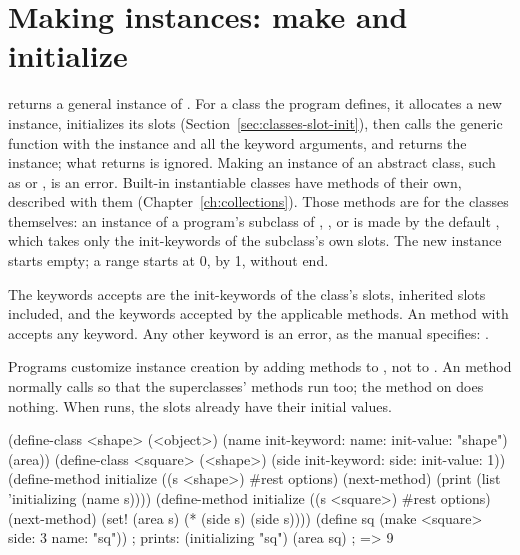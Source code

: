 \section{Making instances: make and initialize}\label{sec:classes-make}

\begin{quote}
\end{quote}

\noindent {} returns a general instance of . For a
class the program defines, it allocates a new instance, initializes its
slots (Section~\ref{sec:classes-slot-init}), then calls the generic function
 with the instance and all the keyword arguments, and
returns the instance; what  returns is ignored. Making an
instance of an abstract class, such as  or
, is an error. Built-in instantiable classes have
 methods of their own, described with them
(Chapter~\ref{ch:collections}). Those methods are for the classes
themselves: an instance of a program's subclass of ,
,  or  is made by
the default , which takes only the init-keywords of the
subclass's own slots. The new instance starts empty; a range starts at 0,
by 1, without end.

The keywords  accepts are the init-keywords of the class's slots,
inherited slots included, and the keywords accepted by the applicable
 methods. An  method with 
accepts any keyword. Any other keyword is an error, as the manual
specifies: .

Programs customize instance creation by adding methods to
, not to . An  method normally
calls  so that the superclasses' methods run too; the
method on  does nothing. When  runs, the
slots already have their initial values.

\begin{dylan}
(define-class <shape> (<object>)
  (name init-keyword: name: init-value: "shape")
  (area))
(define-class <square> (<shape>)
  (side init-keyword: side: init-value: 1))
(define-method initialize ((s <shape>) #rest options)
  (next-method)
  (print (list 'initializing (name s))))
(define-method initialize ((s <square>) #rest options)
  (next-method)
  (set! (area s) (* (side s) (side s))))
(define sq (make <square> side: 3 name: "sq"))
                               ; prints: (initializing "sq")
(area sq)                      ; => 9
\end{dylan}

